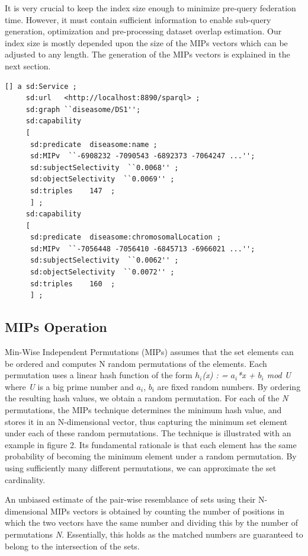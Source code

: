 \documentclass{sig-alternate}  %
\begin{document}
It is very crucial to keep the index size enough to minimize pre-query federation time. However, it must contain sufficient information to enable sub-query generation, optimization and pre-processing dataset overlap estimation. Our index size is mostly depended upon the size of the MIPs vectors which can be adjusted to any length. The generation of the MIPs vectors is explained in the next section. 
\begin{lstlisting}[caption = {A Service Description Example},basicstyle={\tiny},float,frame={single},stringstyle={\ttfamily}]
[] a sd:Service ;
     sd:url   <http://localhost:8890/sparql> ;
     sd:graph ``diseasome/DS1'';
     sd:capability
     [
      sd:predicate  diseasome:name ;
      sd:MIPv  ``-6908232 -7090543 -6892373 -7064247 ...'';           
      sd:subjectSelectivity  ``0.0068'' ;
      sd:objectSelectivity  ``0.0069'' ;
      sd:triples    147  ;
      ] ;
     sd:capability
     [
      sd:predicate  diseasome:chromosomalLocation ;
      sd:MIPv  ``-7056448 -7056410 -6845713 -6966021 ...'';
      sd:subjectSelectivity  ``0.0062'' ;
      sd:objectSelectivity  ``0.0072'' ;
      sd:triples    160  ;
      ] ;
\end{lstlisting}
\subsection{MIPs Operation}
Min-Wise Independent Permutations (MIPs) assumes that the set elements can
be ordered and computes N random
permutations of the elements. Each permutation uses a linear hash
function of the form  \emph{$h_i$(x) : = $a_i$*x + $b_i$ mod U} 
where \emph{U} is a big prime number and $a_i$,
$b_i$ are fixed random numbers. By ordering the resulting
hash values, we obtain a random permutation. For each of the \emph{N} permutations,
the MIPs technique determines the minimum hash value, and stores it
in an N-dimensional vector, thus capturing the minimum set element
under each of these random permutations. The technique is illustrated
with an example in figure 2. Its fundamental rationale
is that each element has the same probability of becoming the minimum
element under a random permutation. By using sufficiently many different
permutations, we can approximate the set cardinality.

An unbiased estimate of the pair-wise resemblance of sets using their
N-dimensional MIPs vectors is obtained by counting the number of positions
in which the two vectors have the same number and dividing this by
the number of permutations \emph{N}. Essentially, this holds as the matched
numbers are guaranteed to belong to the intersection of the sets.
\end{document}
